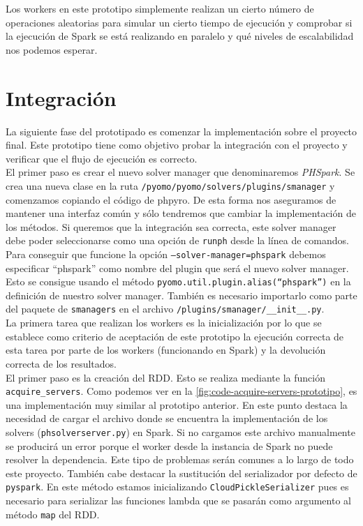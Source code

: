 Los workers en este prototipo simplemente realizan un cierto número de operaciones aleatorias para simular un cierto tiempo de ejecución y comprobar si la ejecución de Spark se está realizando en paralelo y qué niveles de escalabilidad nos podemos esperar.

\section{Integración}


La siguiente fase del prototipado es comenzar la implementación sobre el proyecto final. Este prototipo tiene como objetivo probar la integración con el proyecto y verificar que el flujo de ejecución es correcto.\\

El primer paso es crear el nuevo solver manager que denominaremos \textit{PHSpark}. Se crea una nueva clase en la ruta \texttt{/pyomo/pyomo/solvers/plugins/smanager} y comenzamos copiando el código de phpyro. De esta forma nos aseguramos de mantener una interfaz común y sólo tendremos que cambiar la implementación de los métodos. 
Si queremos que la integración sea correcta, este solver manager debe poder seleccionarse como una opción de \texttt{runph} desde la línea de comandos. Para conseguir que funcione la opción \texttt{--solver-manager=phspark} debemos especificar ``phspark'' como nombre del plugin que será el nuevo solver manager. Esto se consigue usando el método \texttt{pyomo.util.plugin.alias(``phspark'')} en la definición de nuestro solver manager. También es necesario importarlo como parte del paquete de \texttt{smanagers} en el archivo \texttt{/plugins/smanager/\_\_init\_\_.py}.\\

La primera tarea que realizan los workers es la inicialización por lo que se establece como criterio de aceptación de este prototipo la ejecución correcta de esta tarea por parte de los workers (funcionando en Spark) y la devolución correcta de los resultados.\\

El primer paso es la creación del RDD. Esto se realiza mediante la función \texttt{acquire\_servers}. Como podemos ver en la \autoref{fig:code-acquire-servers-prototipo}, es una implementación muy similar al prototipo anterior. En este punto destaca la necesidad de cargar el archivo donde se encuentra la implementación de los solvers (\texttt{phsolverserver.py}) en Spark. Si no cargamos este archivo manualmente se producirá un error porque el worker desde la instancia de Spark no puede resolver la dependencia. Este tipo de problemas serán comunes a lo largo de todo este proyecto. También cabe destacar la sustitución del serializador por defecto de \texttt{pyspark}. En este método estamos inicializando \texttt{CloudPickleSerializer} pues es necesario para serializar las funciones lambda que se pasarán como argumento al método \texttt{map} del RDD.\\


